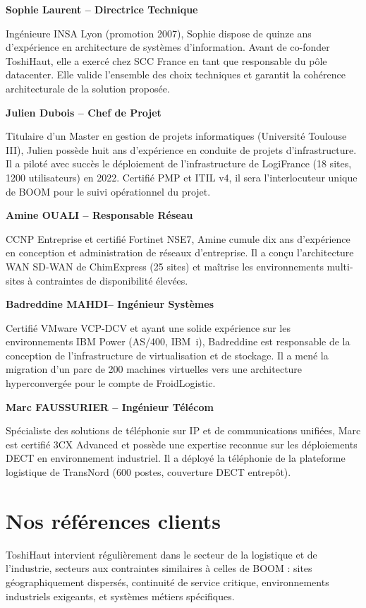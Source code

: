 \documentclass[12pt,a4paper]{report}
\begin{document}
\textbf{Sophie Laurent -- Directrice Technique}

Ingénieure INSA Lyon (promotion 2007), Sophie dispose de quinze ans d'expérience en architecture de systèmes d'information. Avant de co-fonder ToshiHaut, elle a exercé chez SCC France en tant que responsable du pôle datacenter. Elle valide l'ensemble des choix techniques et garantit la cohérence architecturale de la solution proposée.

\textbf{Julien Dubois -- Chef de Projet}

Titulaire d'un Master en gestion de projets informatiques (Université Toulouse III), Julien possède huit ans d'expérience en conduite de projets d'infrastructure. Il a piloté avec succès le déploiement de l'infrastructure de LogiFrance (18 sites, 1200 utilisateurs) en 2022. Certifié PMP et ITIL v4, il sera l'interlocuteur unique de BOOM pour le suivi opérationnel du projet.

\textbf{Amine OUALI -- Responsable Réseau}

CCNP Entreprise et certifié Fortinet NSE7, Amine cumule dix ans d'expérience en conception et administration de réseaux d'entreprise. Il a conçu l'architecture WAN SD-WAN de ChimExpress (25 sites) et maîtrise les environnements multi-sites à contraintes de disponibilité élevées.

\textbf{Badreddine MAHDI-- Ingénieur Systèmes}

Certifié VMware VCP-DCV et ayant une solide expérience sur les environnements IBM Power (AS/400, IBM~i), Badreddine est responsable de la conception de l'infrastructure de virtualisation et de stockage. Il a mené la migration d'un parc de 200 machines virtuelles vers une architecture hyperconvergée pour le compte de FroidLogistic.

\textbf{Marc FAUSSURIER -- Ingénieur Télécom}

Spécialiste des solutions de téléphonie sur IP et de communications unifiées, Marc est certifié 3CX Advanced et possède une expertise reconnue sur les déploiements DECT en environnement industriel. Il a déployé la téléphonie de la plateforme logistique de TransNord (600 postes, couverture DECT entrepôt).

\section{Nos références clients}

ToshiHaut intervient régulièrement dans le secteur de la logistique et de l'industrie, secteurs aux contraintes similaires à celles de BOOM : sites géographiquement dispersés, continuité de service critique, environnements industriels exigeants, et systèmes métiers spécifiques.
\end{document}

